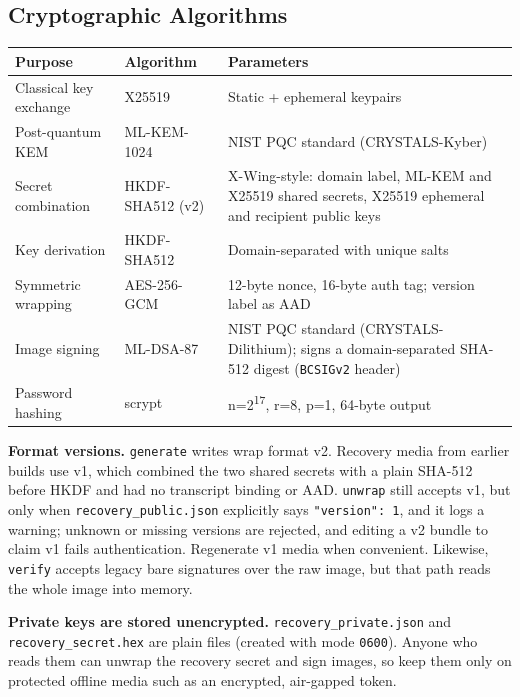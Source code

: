 \documentclass[11pt,letterpaper]{article}
\begin{document}
\subsection{Cryptographic Algorithms}

{\centering\begin{tabularx}{\textwidth}{L{3.8cm} L{3.4cm} Y}
\toprule
\textbf{Purpose} & \textbf{Algorithm} & \textbf{Parameters} \\
\midrule
Classical key exchange & X25519 & Static + ephemeral keypairs \\
Post-quantum KEM & ML-KEM-1024 & NIST PQC standard (CRYSTALS-Kyber) \\
Secret combination & HKDF-SHA512 (v2) & X-Wing-style: domain label, ML-KEM and X25519 shared secrets, X25519 ephemeral and recipient public keys \\
Key derivation & HKDF-SHA512 & Domain-separated with unique salts \\
Symmetric wrapping & AES-256-GCM & 12-byte nonce, 16-byte auth tag; version label as AAD \\
Image signing & ML-DSA-87 & NIST PQC standard (CRYSTALS-Dilithium); signs a domain-separated SHA-512 digest (\texttt{BCSIGv2} header) \\
Password hashing & scrypt & n=2\textsuperscript{17}, r=8, p=1, 64-byte output \\
\bottomrule
\end{tabularx}\par}

\textbf{Format versions.} \texttt{generate} writes wrap format v2. Recovery media from earlier builds use v1, which combined the two shared secrets with a plain SHA-512 before HKDF and had no transcript binding or AAD. \texttt{unwrap} still accepts v1, but only when \texttt{recovery\_public.json} explicitly says \texttt{"version": 1}, and it logs a warning; unknown or missing versions are rejected, and editing a v2 bundle to claim v1 fails authentication. Regenerate v1 media when convenient. Likewise, \texttt{verify} accepts legacy bare signatures over the raw image, but that path reads the whole image into memory.

\textbf{Private keys are stored unencrypted.} \texttt{recovery\_private.json} and \texttt{recovery\_secret.hex} are plain files (created with mode \texttt{0600}). Anyone who reads them can unwrap the recovery secret and sign images, so keep them only on protected offline media such as an encrypted, air-gapped token.


\end{document}
